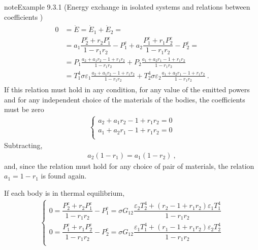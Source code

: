 \documentclass[letterpaper,10pt,english]{jupyterBook}
\begin{document}
\begin{sphinxadmonition}{note}{Example 9.3.1 (Energy exchange in isolated systems and relations between coefficients \sphinxhyphen{}  )}
\begin{equation*}
\begin{split}\begin{aligned}
  0
  & = \dot{E} = \dot{E}_1 + \dot{E}_2 = \\
  & = a_1 \dfrac{P_2^e + r_2 P_1^e}{1 - r_1 r_2} - P_1^e + a_2 \dfrac{P_1^e + r_1 P_2^e}{1 - r_1 r_2} - P_2^e = \\ 
  & = P_1 \frac{a_2 + a_1 r_2 - 1 + r_1 r_2}{1 - r_1 r_2} + P_2 \frac{a_1 + a_2 r_1 - 1 + r_1 r_2}{1 - r_1 r_2} \\ 
  & = T_1^4 \sigma \varepsilon_1 \frac{a_2 + a_1 r_2 - 1 + r_1 r_2}{1 - r_1 r_2} + T_2^4 \sigma \varepsilon_2 \frac{a_1 + a_2 r_1 - 1 + r_1 r_2}{1 - r_1 r_2} \ . 
\end{aligned}\end{split}
\end{equation*}
\sphinxAtStartPar
If this relation must hold in any condition, for any value of the emitted powers and for any independent choice of the materials of the bodies, the coefficients must be zero
\begin{equation*}
\begin{split}\begin{cases}
  a_2 + a_1 r_2 - 1 + r_1 r_2 = 0 \\
  a_1 + a_2 r_1 - 1 + r_1 r_2 = 0 \\
\end{cases}\end{split}
\end{equation*}
\sphinxAtStartPar
Subtracting,
\begin{equation*}
\begin{split}a_2 (1 - r_1) = a_1 (1 - r_2) \ ,\end{split}
\end{equation*}
\sphinxAtStartPar
and, since the relation must hold for any choice of pair of materials, the relation \(a_1 = 1 - r_1\) is found again.

\sphinxAtStartPar
{} If each body is in thermal equilibrium,
\begin{equation*}
\begin{split}\begin{cases}
  0 = \dfrac{P_2^e + r_2 P^{e}_1}{ 1 - r_1 r_2} - P_1^e = \sigma G_{12} \dfrac{ \varepsilon_2 T_2^4 + ( r_2 - 1 + r_1 r_2 ) \varepsilon_1 T_1^4 }{ 1 - r_1 r_2 } \\
  0 = \dfrac{P_1^e + r_1 P^{e}_2}{ 1 - r_1 r_2} - P_2^e = \sigma G_{12} \dfrac{ \varepsilon_1 T_1^4 + ( r_1 - 1 + r_1 r_2 ) \varepsilon_2 T_2^4 }{ 1 - r_1 r_2 } \\
\end{cases}\end{split}
\end{equation*}\end{sphinxadmonition}
\end{document}
